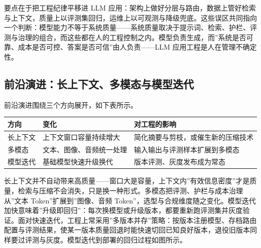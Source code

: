 \documentclass[
]{ctexbook}
\newcounter{none}
\begin{document}
要点在于把工程纪律平移进 LLM
应用：架构上做好分层与路由，数据上管好检索与上下文，质量上以评测集回归，运维上以可观测与降级兜底。这些误区共同指向一个判断：模型能力不等于系统质量------系统质量取决于提示词、检索、护栏、评测与治理的组合，而这些都在人的工程控制之内。模型负责生成，而''系统是否可靠、成本是否可控、答案是否可信''由人负责------LLM
应用工程是人在管理不确定性。

\subsection{前沿演进：长上下文、多模态与模型迭代}\label{ux524dux6cbfux6f14ux8fdbux957fux4e0aux4e0bux6587ux591aux6a21ux6001ux4e0eux6a21ux578bux8fedux4ee3}

前沿演进围绕三个方向展开，如下表所示。

{\def\LTcaptype{none} %
\begin{longtable}[]{@{}
  >{\raggedright\arraybackslash}p{}
  >{\raggedright\arraybackslash}p{}
  >{\raggedright\arraybackslash}p{}@{}}
\toprule\noalign{}
\begin{minipage}[b]{\linewidth}\raggedright
方向
\end{minipage} & \begin{minipage}[b]{\linewidth}\raggedright
变化
\end{minipage} & \begin{minipage}[b]{\linewidth}\raggedright
对工程的影响
\end{minipage} \\
\midrule\noalign{}
\endhead
\bottomrule\noalign{}
\endlastfoot
长上下文 & 上下文窗口容量持续增大 &
简化摘要与剪枝，或催生新的压缩技术 \\
多模态 & 文本、图像、音频统一处理 & 输入输出与评测样本扩展到多模态 \\
模型迭代 & 基础模型快速升级换代 & 版本评测、灰度发布成为常态 \\
\end{longtable}
}

长上下文并不自动带来高质量------窗口大是容量，上下文内''有效信息密度''才是质量，检索与压缩不会消失，只是换一种形式。多模态把评测、护栏与成本治理从''文本
Token''扩展到''图像、音频
Token''，选型与合规维度随之变化。模型迭代加快意味着''升级即回归''：每次换模型或升级版本，都要重新跑评测集并灰度验证。面对快速迭代，工程上常采用''多版本并存''策略：按版本注册模型、存档路由配置与评测结果，使某一版本质量回退时能快速切回已知良好版本，退役旧版本同样要过评测与灰度。模型迭代到部署的回归过程如图所示。
\end{document}
